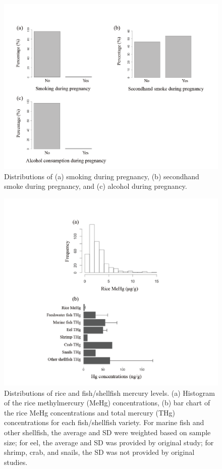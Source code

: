 \begin{figure}
  \centering
    \label{fig:Fig24}
  \includegraphics[scale=1]{Figures/Fig24.pdf}
  \caption[Distributions of (a) smoking during pregnancy, (b) secondhand smoke during
pregnancy, and (c) alcohol during pregnancy]{Distributions of (a) smoking during pregnancy, (b) secondhand smoke during pregnancy, and (c) alcohol during pregnancy.}
\end{figure}

\begin{figure}
  \centering
    \label{fig:Fig25}
  \includegraphics[scale=1]{Figures/Fig25.pdf}
  \caption[Distributions of rice and fish/shellfish mercury levels]{Distributions of rice and fish/shellfish mercury levels. (a) Histogram of the rice methylmercury (MeHg) concentrations, (b) bar chart of the rice MeHg concentrations and total mercury (THg) concentrations for each fish/shellfish variety. For marine fish and other shellfish, the average and SD were weighted based on sample size; for eel, the average and SD was provided by original study; for shrimp, crab, and
snails, the SD was not provided by original studies.}
\end{figure}

